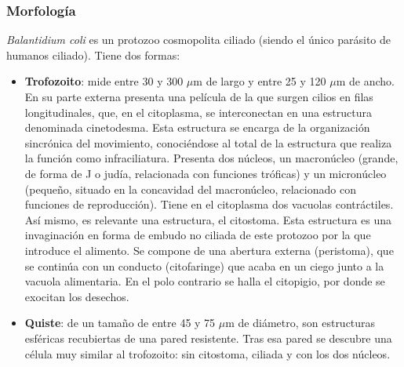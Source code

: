 \subsubsection{Morfología}
\textit{Balantidium coli} es un protozoo cosmopolita ciliado (siendo el único parásito de humanos ciliado). Tiene dos formas:
\begin{itemize}[itemsep=0pt,parsep=0pt,topsep=0pt,partopsep=0pt]
	\item \textbf{Trofozoito}: mide entre 30 y 300 $\mu$m de largo y entre 25 y 120 $\mu$m de ancho. En su parte externa presenta una película de la que surgen cilios en filas longitudinales, que, en el citoplasma, se interconectan en una estructura denominada cinetodesma. Esta estructura se encarga de la organización sincrónica del movimiento, conociéndose al total de la estructura que realiza la función como infraciliatura. Presenta dos núcleos, un macronúcleo (grande, de forma de J o judía, relacionada con funciones tróficas) y un micronúcleo (pequeño, situado en la concavidad del macronúcleo, relacionado con funciones de reproducción). Tiene en el citoplasma dos vacuolas contráctiles. Así mismo, es relevante una estructura, el citostoma. Esta estructura es una invaginación en forma de embudo no ciliada de este protozoo por la que introduce el alimento. Se compone de una abertura externa (peristoma), que se continúa con un conducto (citofaringe) que acaba en un ciego junto a la vacuola alimentaria. En el polo contrario se halla el citopigio, por donde se exocitan los desechos.
	\item \textbf{Quiste}: de un tamaño de entre 45 y 75 $\mu$m de diámetro, son estructuras esféricas recubiertas de una pared resistente. Tras esa pared se descubre una célula muy similar al trofozoito: sin citostoma, ciliada y con los dos núcleos.
\end{itemize}
